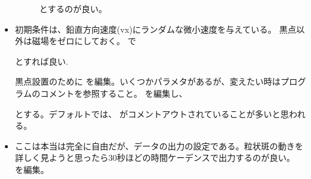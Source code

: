 \documentclass[letterpaper,10pt,dvipdfmx,report]{sphinxmanual}
\begin{document}
\begin{itemize}
\begin{description}
\sphinxAtStartPar
とするのが良い。

\end{description}

\item {} \begin{description}
\sphinxAtStartPar
初期条件は、鉛直方向速度(vx)にランダムな微小速度を与えている。
黒点以外は磁場をゼロにしておく。
 で

\begin{sphinxVerbatim}[commandchars=\\\{\}]
\end{sphinxVerbatim}

\sphinxAtStartPar
とすれば良い.

\sphinxAtStartPar
黒点設置のために  を編集。いくつかパラメタがあるが、変えたい時はプログラムのコメントを参照すること。  を編集し、

\begin{sphinxVerbatim}[commandchars=\\\{\}]
\end{sphinxVerbatim}

\sphinxAtStartPar
とする。デフォルトでは、  がコメントアウトされていることが多いと思われる。

\end{description}

\item {} \begin{description}
\sphinxAtStartPar
ここは本当は完全に自由だが、データの出力の設定である。粒状斑の動きを詳しく見ようと思ったら30秒ほどの時間ケーデンスで出力するのが良い。
 を編集。

\begin{sphinxVerbatim}[commandchars=\\\{\}]
\end{sphinxVerbatim}


\end{description}
\end{itemize}
\end{document}
